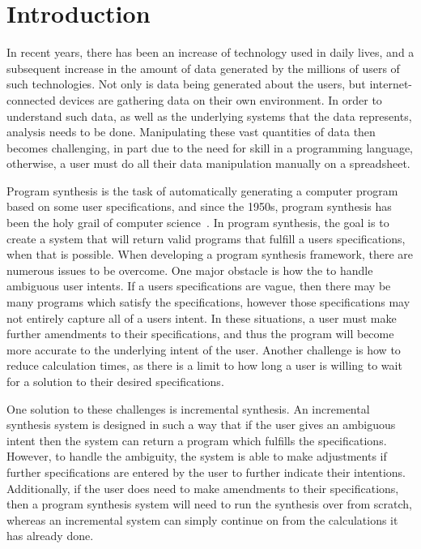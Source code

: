 \section{Introduction}
\label{sec:intro}

In recent years, there has been an increase of technology used in daily lives, and a subsequent increase in the amount of data generated by the millions of users of such technologies. Not only is data being generated about the users, but internet-connected devices are gathering data on their own environment. In order to understand such data, as well as the underlying systems that the data represents, analysis needs to be done. Manipulating these vast quantities of data then becomes challenging, in part due to the need for skill in a programming language, otherwise, a user must do all their data manipulation manually on a spreadsheet.

Program synthesis is the task of automatically generating a computer program based on some user specifications, and since the 1950s, program synthesis has been the holy grail of computer science~\citep{PGL-010}. In program synthesis, the goal is to create a system that will return valid programs that fulfill a users specifications, when that is possible. When developing a program synthesis framework, there are numerous issues to be overcome. One major obstacle is how the to handle ambiguous user intents. If a users specifications are vague, then there may be many programs which satisfy the specifications, however those specifications may not entirely capture all of a users intent. In these situations, a user must make further amendments to their specifications, and thus the program will become more accurate to the underlying intent of the user. Another challenge is how to reduce calculation times, as there is a limit to how long a user is willing to wait for a solution to their desired specifications.

One solution to these challenges is incremental synthesis. An incremental synthesis system is designed in such a way that if the user gives an ambiguous intent then the system can return a program which fulfills the specifications. However, to handle the ambiguity, the system is able to make adjustments if further specifications are entered by the user to further indicate their intentions. Additionally, if the user does need to make amendments to their specifications, then a program synthesis system will need to run the synthesis over from scratch, whereas an incremental system can simply continue on from the calculations it has already done.